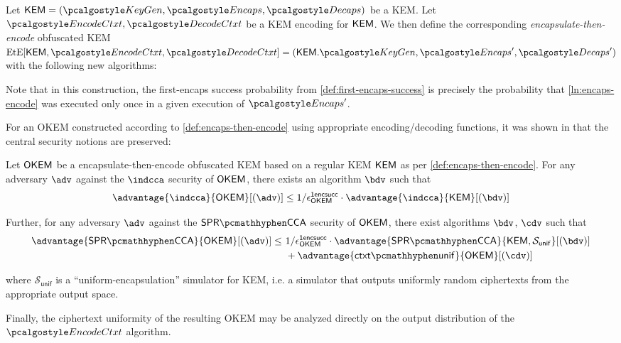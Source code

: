 \begin{definition}
\label{def:encaps-then-encode}
    Let $\KEM = (\kgen, \encaps, \decaps)$ be a KEM.
    Let $\encodectxt, \decodectxt$ be a KEM encoding for $\mathsf{KEM}$.
    We then define the corresponding \emph{encapsulate-then-encode} obfuscated KEM $\ete[\KEM, \encodectxt, \decodectxt] = (\KEM.\kgen, \encaps', \decaps')$ with the following new algorithms:

    
\end{definition}

Note that in this construction, the first-encaps success probability from \cref{def:first-encaps-success} is precisely the probability that \cref{ln:encaps-encode} was executed only once in a given execution of $\encaps'$.

For an OKEM constructed according to \cref{def:encaps-then-encode} using appropriate encoding/decoding functions, it was shown in \cite[Theorems 2.12 and 2.13]{CCS:GunSteVei24} that the central security notions are preserved:

\begin{theorem}\label{thm:encaps-then-encode-security}
    Let $\mathsf{OKEM}$ be a encapsulate-then-encode obfuscated KEM based on a regular KEM $\mathsf{KEM}$ as per \cref{def:encaps-then-encode}.
    For any adversary $\adv$ against the $\indcca$ security of $\mathsf{OKEM}$, there exists an algorithm $\bdv$ such that
    \[
        \advantage{\indcca}{\OKEM}[(\adv)]
        \leq
        1/\epsilon^\firstencapssuccess_\OKEM
        \cdot \advantage{\indcca}{\KEM}[(\bdv)]
    \]

    Further, for any adversary $\adv$ against the $\sprcca$ security of $\mathsf{OKEM}$, there exist algorithms $\bdv$, $\cdv$ such that
    \begin{align*}
        \advantage{\sprcca}{\OKEM}[(\adv)]
        \leq\ 
        & 1/\epsilon^\firstencapssuccess_\OKEM
        \cdot \advantage{\sprcca}{\KEM, \mathcal S_\mathsf{unif}}[(\bdv)] \\
        &+ \advantage{\ctxtunif}{\OKEM}[(\cdv)]
    \end{align*}
    
    where $\mathcal S_\mathsf{unif}$ is a ``uniform-encapsulation'' simulator for KEM, i.e. a simulator that outputs uniformly random ciphertexts from the appropriate output space.
\end{theorem}

Finally, the ciphertext uniformity of the resulting OKEM may be analyzed directly on the output distribution of the $\encodectxt$ algorithm.

